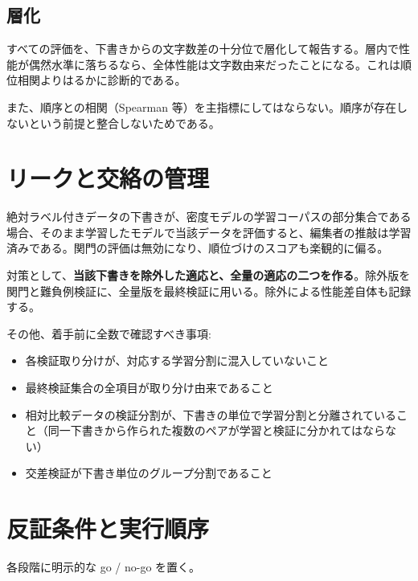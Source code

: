 \documentclass[a4paper,10.5pt]{ltjsarticle}
\begin{document}
\subsection{層化}

すべての評価を、下書きからの文字数差の十分位で層化して報告する。層内で性能が偶然水準に落ちるなら、全体性能は文字数由来だったことになる。これは順位相関よりはるかに診断的である。

また、順序との相関（Spearman 等）を主指標にしてはならない。順序が存在しないという前提と整合しないためである。

\section{リークと交絡の管理}

\begin{warnbox}[title=最も見落とされやすい罠]
絶対ラベル付きデータの下書きが、密度モデルの学習コーパスの部分集合である場合、そのまま学習したモデルで当該データを評価すると、編集者の推敲は学習済みである。関門の評価は無効になり、順位づけのスコアも楽観的に偏る。

対策として、\textbf{当該下書きを除外した適応と、全量の適応の二つを作る}。除外版を関門と難負例検証に、全量版を最終検証に用いる。除外による性能差自体も記録する。
\end{warnbox}

その他、着手前に全数で確認すべき事項:

\begin{itemize}
  \item 各検証取り分けが、対応する学習分割に混入していないこと
  \item 最終検証集合の全項目が取り分け由来であること
  \item 相対比較データの検証分割が、下書きの単位で学習分割と分離されていること（同一下書きから作られた複数のペアが学習と検証に分かれてはならない）
  \item 交差検証が下書き単位のグループ分割であること
\end{itemize}

\section{反証条件と実行順序}

各段階に明示的な go / no-go を置く。
\end{document}
